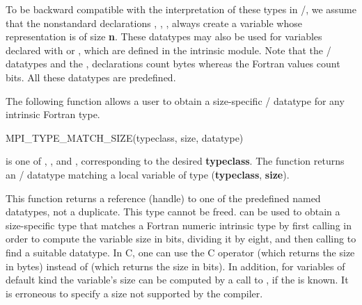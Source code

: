 To be backward compatible with the interpretation of
these types in \MPII/, we assume that the nonstandard declarations
, , , always create a variable whose
representation is of size \textbf{n}.
These datatypes may also be used for variables declared with
 or ,
which are defined in the  intrinsic module.
Note that the \MPI/ datatypes and the , 
declarations count bytes whereas
the Fortran  values count bits.
All these datatypes are predefined.

The following function allows a user to obtain a size-specific \MPI/ datatype
for any intrinsic Fortran type.

\begin{funcdef}{MPI\_TYPE\_MATCH\_SIZE}{(\mbox{typeclass}, \mbox{size}, \mbox{datatype})}
\end{funcdef}

 is one of ,
, and
,
corresponding to the  desired \textbf{typeclass}.  The function returns
an \MPI/ datatype matching a local variable of type (\textbf{typeclass},
\textbf{size}).

This function
returns a reference (handle) to one of the predefined named
datatypes, not a duplicate. This type cannot be freed.
 can be used to obtain a size-specific type that
matches a Fortran numeric intrinsic type by first calling
 in order to compute the variable size in bits,
dividing it by eight, and then
calling  to find a suitable
datatype.
In C,
one can use the C operator  (which returns the size
in bytes) instead of  (which returns the size in
bits).
In addition, for variables of default kind
the variable's size can be computed by a call to
, if the  is known.
It is erroneous to specify a size not supported by the compiler.

